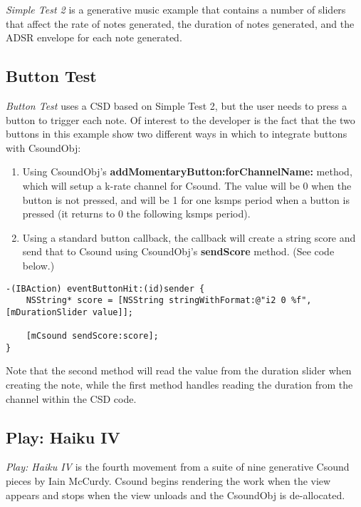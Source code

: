 \documentclass[11pt]{article}
\begin{document}
\emph{Simple Test 2} is a generative music example that contains a number of sliders that affect the rate of notes generated, the duration of notes generated, and the ADSR envelope for each note generated.

\subsection{Button Test}

\emph{Button Test} uses a CSD based on Simple Test 2, but the user needs to press a button to trigger each note.  Of interest to the developer is the fact that the two buttons in this example show two different ways in which to integrate buttons with CsoundObj:

\begin{enumerate}
\item Using CsoundObj's \textbf{addMomentaryButton:forChannelName:} method, which will setup a k-rate channel for Csound.  The value will be 0 when the button is not pressed, and will be 1 for one ksmps period when a button is pressed (it returns to 0 the following ksmps period).
\item Using a standard button callback, the callback will create a string score and send that to Csound using CsoundObj's \textbf{sendScore} method. (See code below.)
\end{enumerate}

\begin{lstlisting}[caption=Example code showing sending score text to CsoundObj]
-(IBAction) eventButtonHit:(id)sender {
    NSString* score = [NSString stringWithFormat:@"i2 0 %f", [mDurationSlider value]];

    [mCsound sendScore:score];
}
\end{lstlisting}

Note that the second method will read the value from the duration slider when creating the note, while the first method handles reading the duration from the channel within the CSD code.

\subsection{Play: Haiku IV}

\emph{Play: Haiku IV} is the fourth movement from a suite of nine generative Csound pieces by Iain McCurdy. Csound begins rendering the work when the view appears and stops when the view unloads and the CsoundObj is de-allocated.   
\end{document}
